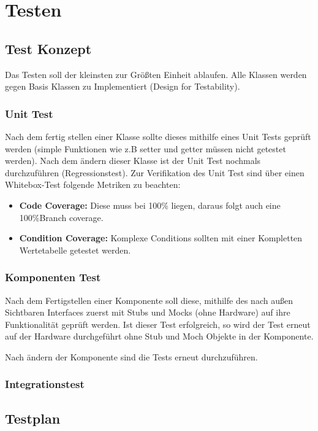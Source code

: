 \chapter{Testen}

\section{Test Konzept}
Das Testen soll der kleinsten zur Größten Einheit ablaufen.
Alle Klassen werden gegen Basis Klassen zu Implementiert (Design for Testability).

\subsection{Unit Test}
Nach dem fertig stellen einer Klasse sollte dieses mithilfe eines Unit Tests geprüft werden (simple Funktionen wie z.B setter und getter müssen nicht getestet werden).
Nach dem ändern dieser Klasse ist der Unit Test nochmals durchzuführen (Regressionstest).
Zur Verifikation des Unit Test sind über einen Whitebox-Test folgende Metriken zu beachten:
\begin{itemize} 
\item \textbf{Code Coverage:} Diese muss bei 100\% liegen, daraus folgt auch eine 100\%Branch coverage.
\item\textbf{Condition Coverage:} Komplexe Conditions sollten mit einer Kompletten Wertetabelle getestet werden.
\end{itemize}

\subsection{Komponenten Test}
Nach dem Fertigstellen einer Komponente soll diese, mithilfe des nach außen Sichtbaren Interfaces zuerst mit Stubs und Mocks (ohne Hardware) auf ihre Funktionalität geprüft werden.
Ist dieser Test erfolgreich, so wird der Test erneut auf der Hardware durchgeführt ohne Stub und Moch Objekte in der Komponente. 

Nach ändern der Komponente sind die Tests erneut durchzuführen.

\subsection{Integrationstest}


\section{Testplan}

